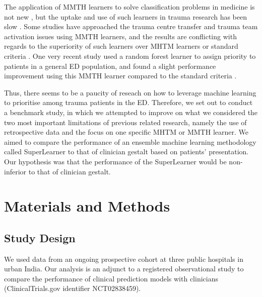 \documentclass[10pt,letterpaper]{article}\usepackage[]{graphicx}\usepackage[]{color}
\begin{document}
The application of MMTH learners to solve classification problems in medicine is
not new \cite{Nevin2018}, but the uptake and use of such learners in trauma
research has been slow \cite{Liu2017}. Some studies have approached the trauma
centre transfer and trauma team activation issues using MMTH learners, and the
results are conflicting with regards to the superiority of such learners over
MHTM learners or standard criteria
\cite{Talbert2007,Pearl2008,Scerbo2014,Follin2016}. One very recent study used a
random forest learner to assign priority to patients in a general ED population,
and found a slight performance improvement using this MMTH learner compared to
the standard criteria \cite{Levin2018}.

Thus, there seems to be a paucity of reseach on how to leverage machine learning
to prioritise among trauma patients in the ED. Therefore, we set out to conduct
a benchmark study, in which we attempted to improve on what we considered the
two most important limitations of previous related research, namely the use of
retrospective data and the focus on one specific MHTM or MMTH learner. We aimed
to compare the performance of an ensemble machine learning methodology called
SuperLearner to that of clinician gestalt based on patients’ presentation. Our
hypothesis was that the performance of the SuperLearner would be non-inferior to
that of clinician gestalt.

\section*{Materials and Methods}
\subsection*{Study Design}
We used data from an ongoing prospective cohort at three public hospitals in
urban India. Our analysis is an adjunct to a registered observational study to
compare the performance of clinical prediction models with clinicians
(ClinicalTrials.gov identifier NCT02838459).

\end{document}
